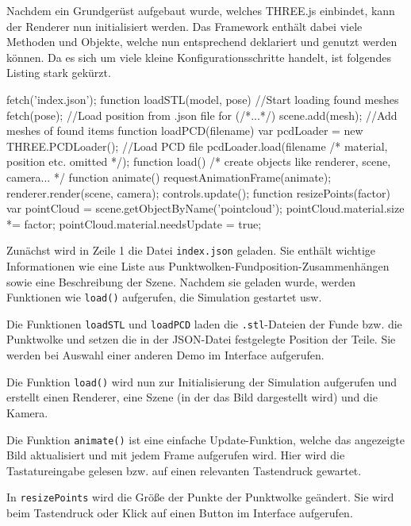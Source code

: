 Nachdem ein Grundgerüst aufgebaut wurde, welches THREE.js einbindet, kann der Renderer nun initialisiert werden. Das Framework
enthält dabei viele Methoden und Objekte, welche nun entsprechend deklariert und
genutzt werden können. Da es sich um viele kleine Konfigurationsschritte handelt,
ist folgendes Listing stark gekürzt.

\begin{code}[language=javascript, caption={Initialisierung von \texttt{THREE.js}}]
fetch('index.json');
function loadSTL(model, pose) { //Start loading found meshes
	fetch(pose); //Load position from .json file
	for (/*...*/) {
		scene.add(mesh); //Add meshes of found items
	}
}
function loadPCD(filename) {
	var pcdLoader = new THREE.PCDLoader(); //Load PCD file
	pcdLoader.load(filename /* material, position etc. omitted */);
}
function load() {
	/* create objects like renderer, scene, camera... */
}
function animate() {
	requestAnimationFrame(animate);
	renderer.render(scene, camera);
	controls.update();
}
function resizePoints(factor) {
	var pointCloud = scene.getObjectByName('pointcloud');
	pointCloud.material.size *= factor;
	pointCloud.material.needsUpdate = true;
}
\end{code}

Zunächst wird in Zeile 1 die Datei \texttt{index.json} geladen. Sie enthält wichtige Informationen wie eine Liste aus Punktwolken-Fundposition-Zusammenhängen sowie eine Beschreibung der Szene. Nachdem sie geladen wurde, werden Funktionen wie \texttt{load()} aufgerufen, die Simulation gestartet usw.

Die Funktionen \texttt{loadSTL} und \texttt{loadPCD} laden die \texttt{.stl}-Dateien der Funde bzw. die Punktwolke und setzen die in der JSON-Datei festgelegte Position der Teile. Sie werden bei Auswahl einer anderen Demo im Interface aufgerufen.

Die Funktion \texttt{load()} wird nun zur Initialisierung der Simulation aufgerufen und erstellt
einen Renderer, eine Szene (in der das Bild dargestellt wird) und die Kamera.

Die Funktion \texttt{animate()} ist eine einfache Update-Funktion, welche das
angezeigte Bild aktualisiert und mit jedem Frame aufgerufen wird. Hier wird
die Tastatureingabe gelesen bzw. auf einen relevanten Tastendruck gewartet.

In \texttt{resizePoints} wird die Größe der Punkte der Punktwolke geändert. Sie wird beim Tastendruck oder Klick auf einen Button im Interface aufgerufen.



